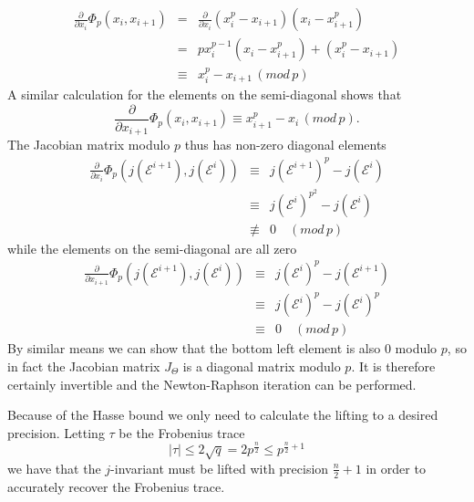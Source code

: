 \begin{eqnarray}
 \frac{\partial}{\partial x_i} \Phi_p(x_i, x_{i+1}) &=& \frac{\partial}{\partial x_i}(x_i^p-x_{i+1})(x_i-x_{i+1}^p)\nonumber \\
						    &=& p x_i^{p-1}(x_i-x_{i+1}^p)+(x_i^p-x_{i+1})\nonumber \\
						    &\equiv& x_i^p-x_{i+1}\, (mod\, p) \nonumber
\end{eqnarray}
A similar calculation for the elements on the semi-diagonal shows that
$$ \frac{\partial}{\partial x_{i+1}} \Phi_p(x_i, x_{i+1}) \equiv x_{i+1}^p - x_i \, (mod\,p). $$
The Jacobian matrix modulo $p$ thus has non-zero diagonal elements
\begin{eqnarray}
 \frac{\partial}{\partial x_i} \Phi_p(j(\mathscr{E}^{i+1}), j(\mathscr{E}^i)) &\equiv& j(\mathscr{E}^{i+1})^p-j(\mathscr{E}^i) \nonumber \\
									      &\equiv& j(\mathscr{E}^i)^{p^2}-j(\mathscr{E}^i) \nonumber \\
									      &\not\equiv& 0 \quad (mod\, p) \nonumber
\end{eqnarray}
while the elements on the semi-diagonal are all zero
\begin{eqnarray}
 \frac{\partial}{\partial x_{i+1}} \Phi_p(j(\mathscr{E}^{i+1}), j(\mathscr{E}^i)) &\equiv& j(\mathscr{E}^i)^p-j(\mathscr{E}^{i+1}) \nonumber \\
										  &\equiv& j(\mathscr{E}^i)^p-j(\mathscr{E}^i)^p \nonumber \\
										  &\equiv& 0 \quad (mod\, p) \nonumber
\end{eqnarray}
By similar means we can show that the bottom left element is also $0$ modulo $p$, so in fact the Jacobian matrix
$J_\Theta$ is a diagonal matrix modulo $p$.
It is therefore certainly invertible and the Newton-Raphson iteration can be performed.

Because of the Hasse bound we only need to calculate the lifting to a desired precision. Letting $\tau$
be the Frobenius trace
$$\mid \tau \mid \leq 2\sqrt{q} = 2p^{\frac{n}{2}} \leq p^{\frac{n}{2}+1} $$
we have that the $j$-invariant must be lifted with precision $\frac{n}{2}+1$ in order to accurately recover
the Frobenius trace.

